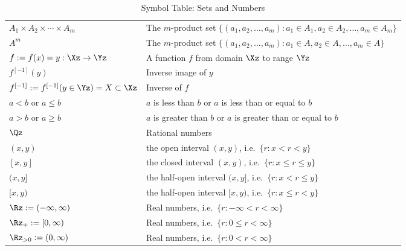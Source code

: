 {\begin{table}[htb]
{\begin{tabular}{| l | l |}
$A_1 \times A_2 \times \cdots \times A_m$ & The $m$-product set $\{(a_1,a_2,\ldots,a_{m}): a_1 \in A_1, a_2 \in A_2, \ldots, a_{m} \in A_m \}$ \\
$A^m$ & The $m$-product set $\{(a_1,a_2,\ldots,a_{m}): a_1 \in A, a_2 \in A, \ldots, a_{m} \in A \}$ \\ 
$f := f(x)=y:\Xz \to \Yz$ & A function $f$ from domain $\Xz$ to range $\Yz$ \\
$f^{[-1]}(y)$ & Inverse image of $y$ \\ 
$f^{[-1]} := f^{[-1]}(y \in \Yz) = X \subset \Xz$ & Inverse of $f$ \\ 
$a<b$ or $a \leq b$ & $a$ is less than $b$ or $a$ is less than or equal to $b$ \\
$a>b$ or $a \geq b$ & $a$ is greater than $b$ or $a$ is greater than or equal to $b$ \\ 
$\Qz$ & Rational numbers \\ 
$(x,y)$ & the open interval $(x,y)$, i.e.~$\{r: x < r < y\}$ \\ 
$[x,y]$ & the closed interval $(x,y)$, i.e.~$\{r: x \leq r \leq y\}$ \\ 
$(x,y]$ & the half-open interval $(x,y]$, i.e.~$\{r: x < r \leq y\}$ \\ 
$[x,y)$ & the half-open interval $[x,y)$, i.e.~$\{r: x \leq r < y\}$ \\ 
$\Rz := (-\infty,\infty)$ & Real numbers, i.e.~$\{r: -\infty < r <  \infty \}$ \\
$\Rz_+ := [0,\infty)$ & Real numbers, i.e.~$\{r: 0 \leq r <  \infty \}$ \\
$\Rz_{>0} := (0,\infty)$ & Real numbers, i.e.~$\{r: 0 < r <  \infty \}$ \\
\hline
\end{tabular}
}
\caption{Symbol Table: Sets and Numbers \label{T:SummarySymbTableSets}}
\end{table}


}
